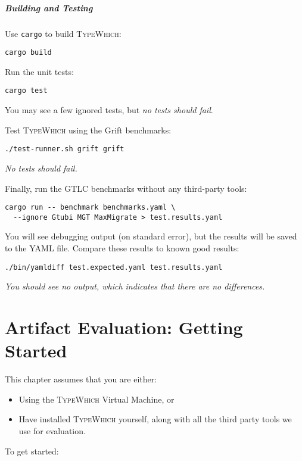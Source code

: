 \documentclass{book}
\newcommand{\system}{\textsc{TypeWhich}\xspace}
\begin{document}
\paragraph{Building and Testing}

Use \texttt{cargo} to build \system:

\begin{verbatim}
cargo build
\end{verbatim}

Run the unit tests:
\begin{verbatim}
cargo test
\end{verbatim}
You may see a few ignored tests, but \emph{no tests should fail}.

Test \system using the Grift benchmarks:
\begin{verbatim}
./test-runner.sh grift grift
\end{verbatim}
\emph{No tests should fail.}

Finally, run the GTLC benchmarks without any third-party tools:
\begin{verbatim}
cargo run -- benchmark benchmarks.yaml \
  --ignore Gtubi MGT MaxMigrate > test.results.yaml
\end{verbatim}
You will see debugging output (on standard error), but the results will
be saved to the YAML file. Compare these results to known good results:
\begin{verbatim}
./bin/yamldiff test.expected.yaml test.results.yaml
\end{verbatim}
\emph{You should see no output, which indicates that there are no
differences.}

\chapter{Artifact Evaluation: Getting Started}
\label{getting-started} 

This chapter assumes that you are either:

\begin{itemize}

     \item Using the \system Virtual Machine, or
     \item Have installed \system yourself, along with all the third party
     tools we use for evaluation.

\end{itemize}

To get started:
\end{document}

